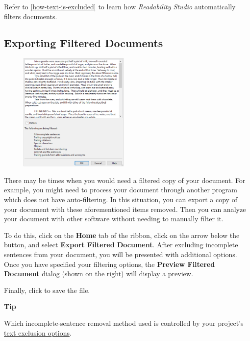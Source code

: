 \documentclass[
]{book}
\newenvironment{tipsection}
    {
    \begin{tcolorbox}[colframe=lightgray,colback=lightyellow,arc=3mm]
    \faLightbulb[regular] \textbf{Tip} \newline
    }
    {
    \end{tcolorbox}
    }
\theoremstyle{definition}
\theoremstyle{definition}
\theoremstyle{definition}
\theoremstyle{definition}
\theoremstyle{remark}
\begin{document}
Refer to \ref{how-text-is-excluded} to learn how \emph{Readability Studio} automatically filters documents.

\hypertarget{exporting-filtered-documents}{%
\subsection*{Exporting Filtered Documents}\label{exporting-filtered-documents}}

\begin{figure}
\includegraphics[width=0.48\textwidth,height=\textheight]{Images/FilterTextPreview.png}

\end{figure}

There may be times when you would need a filtered copy of your document. For example, you might need to process your document through another program which does not have auto-filtering. In this situation, you can export a copy of your document with these aforementioned items removed. Then you can analyze your document with other software without needing to manually filter it.

To do this, click on the \textbf{Home} tab of the ribbon, click on the arrow below the  button, and select \textbf{Export Filtered Document}. After excluding incomplete sentences from your document, you will be presented with additional options. Once you have specified your filtering options, the \textbf{Preview Filtered Document} dialog (shown on the right) will display a preview.

Finally, click  to save the file.

\begin{tipsection}
Which incomplete-sentence removal method used is controlled by your project's \protect\hyperlink{options-text-exclusion}{text exclusion options}.

\end{tipsection}
\end{document}
